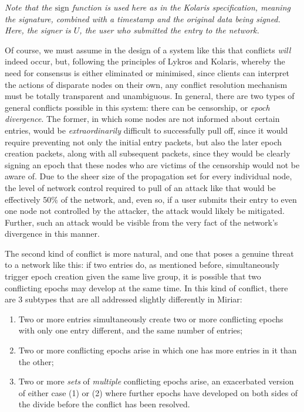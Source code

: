 \documentclass{extreport}
\begin{document}
\emph{Note that the \(\mathrm{sign}\) function is used here as in the Kolaris specification, meaning the signature, combined with a timestamp and the original data being signed. Here, the signer is \(U\), the user who submitted the entry to the network.}

Of course, we must assume in the design of a system like this that conflicts \emph{will} indeed occur, but, following the principles of Lykros and Kolaris, whereby the need for consensus is either eliminated or minimised, since clients can interpret the actions of disparate nodes on their own, any conflict resolution mechanism must be totally transparent and unambiguous. In general, there are two types of general conflicts possible in this system: there can be censorship, or \emph{epoch divergence}. The former, in which some nodes are not informed about certain entries, would be \emph{extraordinarily} difficult to successfully pull off, since it would require preventing not only the initial entry packets, but also the later epoch creation packets, along with all subsequent packets, since they would be clearly signing an epoch that these nodes who are victims of the censorship would not be aware of. Due to the sheer size of the propagation set for every individual node, the level of network control required to pull of an attack like that would be effectively 50\% of the network, and, even so, if a user submits their entry to even one node not controlled by the attacker, the attack would likely be mitigated. Further, such an attack would be visible from the very fact of the network's divergence in this manner.

The second kind of conflict is more natural, and one that poses a genuine threat to a network like this: if two entries do, as mentioned before, simultaneously trigger epoch creation given the same live group, it is possible that two conflicting epochs may develop at the same time. In this kind of conflict, there are 3 subtypes that are all addressed slightly differently in Miriar:

\begin{enumerate}
\item Two or more entries simultaneously create two or more conflicting epochs with only one entry different, and the same number of entries;
\item Two or more conflicting epochs arise in which one has more entries in it than the other;
\item Two or more \emph{sets} of \emph{multiple} conflicting epochs arise, an exacerbated version of either case (1) or (2) where further epochs have developed on both sides of the divide before the conflict has been resolved.
\end{enumerate}
\end{document}
